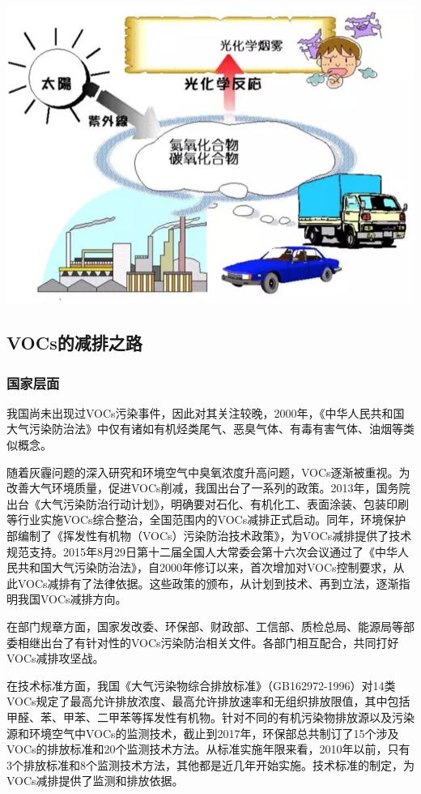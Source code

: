 \documentclass[]{book}
\begin{document}
\includegraphics[width=8.33in]{images/voc6}

\subsection{VOCs的减排之路}\label{vocs}

\subsubsection{国家层面}

我国尚未出现过VOCs污染事件，因此对其关注较晚，2000年，《中华人民共和国大气污染防治法》中仅有诸如有机烃类尾气、恶臭气体、有毒有害气体、油烟等类似概念。

随着灰霾问题的深入研究和环境空气中臭氧浓度升高问题，VOCs逐渐被重视。为改善大气环境质量，促进VOCs削减，我国出台了一系列的政策。2013年，国务院出台《大气污染防治行动计划》，明确要对石化、有机化工、表面涂装、包装印刷等行业实施VOCs综合整治，全国范围内的VOCs减排正式启动。同年，环境保护部编制了《挥发性有机物（VOCs）污染防治技术政策》，为VOCs减排提供了技术规范支持。2015年8月29日第十二届全国人大常委会第十六次会议通过了《中华人民共和国大气污染防治法》，自2000年修订以来，首次增加对VOCs控制要求，从此VOCs减排有了法律依据。这些政策的颁布，从计划到技术、再到立法，逐渐指明我国VOCs减排方向。

在部门规章方面，国家发改委、环保部、财政部、工信部、质检总局、能源局等部委相继出台了有针对性的VOCs污染防治相关文件。各部门相互配合，共同打好VOCs减排攻坚战。

在技术标准方面，我国《大气污染物综合排放标准》（GB162972-1996）对14类VOCs规定了最高允许排放浓度、最高允许排放速率和无组织排放限值，其中包括甲醛、苯、甲苯、二甲苯等挥发性有机物。针对不同的有机污染物排放源以及污染源和环境空气中VOCs的监测技术，截止到2017年，环保部总共制订了15个涉及VOCs的排放标准和20个监测技术方法。从标准实施年限来看，2010年以前，只有3个排放标准和8个监测技术方法，其他都是近几年开始实施。技术标准的制定，为VOCs减排提供了监测和排放依据。
\end{document}
